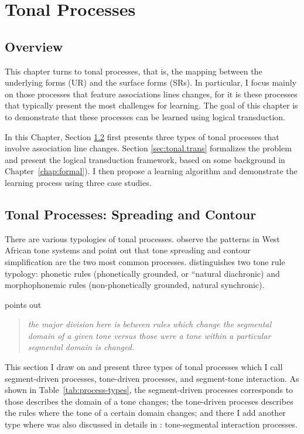 \chapter{Tonal Processes}
\label{chap:process}

\section{Overview}
\label{sec:process-overview}

This chapter turns to tonal processes, that is, the mapping between the
underlying forms (UR) and the surface forms (SRs). In particular, I
focus mainly on those processes that feature associations lines changes,
for it is these processes that typically present the most challenges for
learning. The goal of this chapter is to demonstrate that these
processes can be learned using logical transduction.

In this Chapter, Section \ref{sec:process-type} first presents three 
types of tonal processes that involve association line changes. Section
\ref{sec:tonal.trans} formalizes the problem and present the logical 
transduction framework, based on some background in Chapter~\ref{chap:formal}). 
I then propose a learning algorithm and demonstrate the learning process 
using three case studies.

\section{Tonal Processes: Spreading and Contour}
\label{sec:process-type}
There are various typologies of tonal processes. 
\citet{HymanSchuh1974} observe the patterns in West African tone systems
and point out that tone spreading and contour simplification are the two
most common processes. \citet{Hyman2007} distinguishes
two tone rule typology: phonetic rules (phonetically grounded, or ``natural diachronic) 
and morphophonemic rules (non-phonetically grounded, natural synchronic). 

\citet{schuh1978tone} points out 

\begin{quote}
\textit{the major division here is between rules 
which change the segmental domain of a given tone versus those were a tone within a particular
segmental domain is changed.}
\end{quote}


This section I draw on \citet{schuh1978tone} and present 
three types of tonal processes which I call segment-driven
processes, tone-driven processes, and segment-tone interaction. As shown in
Table~\ref{tab:process-types}, the segment-driven processes corresponds to those \citet{schuh1978tone} describes the domain of a tone changes; the tone-driven proceses describes
the rules where the tone of a certain domain changes; and
there I add another type where was also discussed in details
in \citet{schuh1978tone}: tone-segmental interaction processes.

